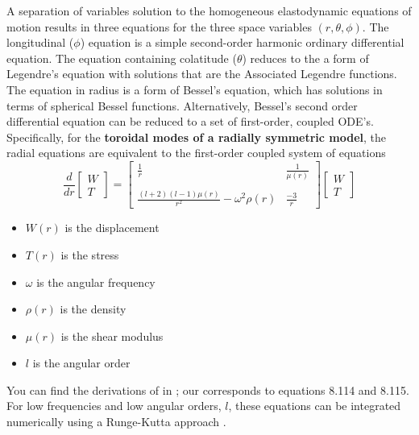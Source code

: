 \documentclass[11pt,titlepage,fleqn]{article}
\begin{document}
A separation of variables solution to the homogeneous elastodynamic equations of motion results in three equations for the three space variables $(r, \theta, \phi)$. The longitudinal ($\phi$) equation is a simple second-order harmonic ordinary differential equation. The equation containing colatitude ($\theta$) reduces to the a form of Legendre's equation with solutions that are the Associated Legendre functions. The equation in radius is a form of Bessel's equation, which has solutions in terms of spherical Bessel functions. Alternatively, Bessel's second order differential equation can be reduced to a set of first-order, coupled ODE's. Specifically, for the {\bf toroidal modes of a radially symmetric model}, the radial equations are equivalent to the
first-order coupled system of equations
%
\begin{equation}
\frac{d}{dr}
\left[ \begin{array}{c} W \\ T \end{array} \right]
=
\left[ \begin{array}{cc}
\frac{1}{r} & \frac{1}{\mu(r)} \\
& \\
\frac{(l+2)(l-1)\mu(r)}{r^2}-\omega^2\rho(r) & \frac{-3}{r}
\end{array} \right]
\left[ \begin{array}{c} W \\ T \end{array} \right]
\label{ODEs}
\end{equation}
%
\begin{itemize}
\item $W(r)$ is the displacement
\item $T(r)$ is the stress
\item $\omega$ is the angular frequency
\item $\rho(r)$ is the density
\item $\mu(r)$ is the shear modulus
\item $l$ is the angular order
\end{itemize}
%
You can find the derivations of  in \cite{DT}; our  corresponds to equations 8.114 and 8.115. For low frequencies and low
angular orders,
$l$, these equations can be integrated numerically using a Runge-Kutta approach \citep[\eg][]{Press1988}.
\end{document}
